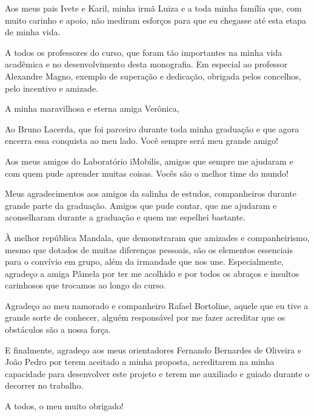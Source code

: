\documentclass[
  12pt,       %
  openright,      %
  oneside,      %
  a4paper,      %
  english,      %
  french,        %
  spanish,     %
  brazil        %
  ]{abntex2-decsi}
\begin{document}


% 



\begin{agradecimentos}

Aos meus pais Ivete e Karil, minha irmã Luiza e a toda minha família que, com muito carinho e apoio, não mediram esforços para que eu chegasse até esta etapa de minha vida. 

A todos os professores do curso, que foram tão importantes na minha vida acadêmica e no desenvolvimento desta monografia. Em especial ao professor Alexandre Magno, exemplo de superação e dedicação, obrigada pelos concelhos, pelo incentivo e amizade.

A minha maravilhosa e eterna amiga Verônica, 

Ao Bruno Lacerda, que foi parceiro durante toda minha graduação e que agora encerra essa conquista ao meu lado. Você sempre será meu grande amigo!

Aos meus amigos do Laboratório iMobilis, amigos que sempre me ajudaram e com quem pude aprender muitas coisas. Vocês são o melhor time do mundo!

Meus agradecimentos aos amigos da salinha de estudos, companheiros durante grande parte da graduação. Amigos que pude contar, que me ajudaram e aconselharam durante a graduação e quem me espelhei bastante.

À melhor república Mandala, que demonstraram que amizades e companheirismo, mesmo que dotados de muitas diferenças pessoais, são os elementos essenciais para o convívio em grupo, além da irmandade que nos une. Especialmente, agradeço a amiga Pâmela por ter me acolhido e por todos os abraços e insultos carinhosos que trocamos ao longo do curso.

Agradeço ao meu namorado e companheiro Rafael Bortoline, aquele que eu tive a grande sorte de conhecer, alguém responsável por me fazer acreditar que os obstáculos são a nossa força.  

E finalmente, agradeço aos meus orientadores Fernando Bernardes de Oliveira e João Pedro por terem aceitado a minha proposta, acreditarem na minha capacidade para desenvolver este projeto e terem me auxiliado e guiado durante o decorrer no trabalho.

A todos, o meu muito obrigado!


\end{agradecimentos}
\end{document}
